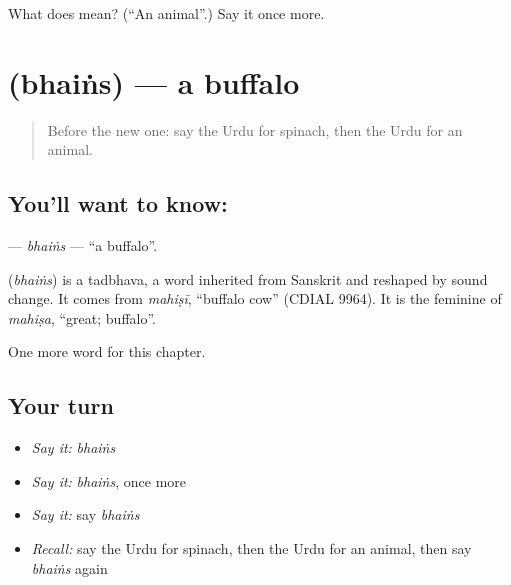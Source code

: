 \begin{tcolorbox}[breakable,colback=teal!4,colframe=teal!35!black,title={Before you move on}]
What does  mean? (\textquotedblleft{}An animal\textquotedblright{}.) Say it once more.
\end{tcolorbox}
\section[\texorpdfstring{\ur{بھینس} (bhaiṅs)}{بھینس (bhaiṅs)}]{ (bhaiṅs) — a buffalo}

\label{lesson:UR-C227-bhains}



\begin{quote}
Before the new one: say the Urdu for spinach, then the Urdu for an animal.
\end{quote}

\subsection*{You'll want to know: }
\textbf{} — \emph{bhaiṅs} — \textquotedblleft{}a buffalo\textquotedblright{}.

\begin{cousinweb}
\textbf{} (\emph{bhaiṅs}) is a tadbhava, a word inherited from Sanskrit and reshaped by sound change. It comes from \emph{mahiṣī}, \textquotedblleft{}buffalo cow\textquotedblright{} (CDIAL 9964). It is the feminine of \emph{mahiṣa}, \textquotedblleft{}great; buffalo\textquotedblright{}.
\end{cousinweb}

\begin{grammarlens}[title={What you've built}]
One more word for this chapter.
\end{grammarlens}

\subsection*{Your turn}
\begin{itemize}
\raggedright
  \item \emph{Say it:} \emph{bhaiṅs}
  \item \emph{Say it:} \emph{bhaiṅs}, once more
  \item \emph{Say it:} say \emph{bhaiṅs}
  \item \emph{Recall:} say the Urdu for spinach, then the Urdu for an animal, then say \emph{bhaiṅs} again
\end{itemize}

